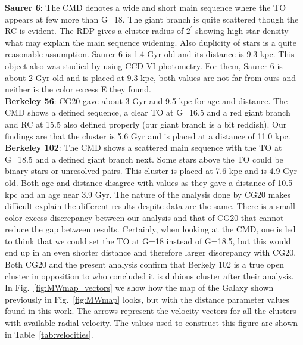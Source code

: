 \documentclass[draft]{aa}
\begin{document}
  \textbf{Saurer 6}: The CMD denotes a wide and short main sequence where the TO
  appears at few more than G=18. The giant branch is quite scattered though the
  RC is evident. The RDP gives a cluster radius of $2^{\prime}$ showing high
  star density what may explain the main sequence widening. Also duplicity of
  stars is a quite reasonable assumption. Saurer 6 is 1.4 Gyr old and its
  distance is 9.3 kpc. This object also was studied by
  \cite{Frinchaboy_2002} using CCD VI photometry. For them, Saurer 6 is about 2
  Gyr old and is placed at 9.3 kpc, both values are not far from ours and
  neither is the color excess E they found.\\

  \textbf{Berkeley 56}: CG20 gave about 3 Gyr and 9.5 kpc for age and distance. The CMD
  shows a defined sequence, a clear TO at G=16.5 and a red giant branch and RC
  at 15.5 also defined properly (our giant branch is a bit reddish).  Our
  findings are that the cluster is 5.6 Gyr and is placed at a distance of 11.0
  kpc.\\

  \textbf{Berkeley 102}: The CMD shows a scattered main sequence with the
  TO at G=18.5 and a defined giant branch next. Some stars above the TO could be
  binary stars or unresolved pairs. This cluster is placed at 7.6 kpc and is 4.9
  Gyr old. Both age and distance disagree with \cite{Cantat_2020}
  values as they gave a distance of 10.5 kpc and an age near
  3.9 Gyr. The nature of the analysis done by CG20 makes difficult
  explain the different results despite data are the same. There is a small
  color excess discrepancy between our analysis and that of CG20 that cannot
  reduce the gap between results. Certainly, when looking at the CMD, one is led
  to think that we could set the TO at G=18 instead of G=18.5, but this would
  end up in an even shorter distance and therefore larger discrepancy with CG20.
  Both CG20 and the present analysis confirm that Berkely 102 is a true open cluster
  in opposition to \cite{Maciejewski_2008} who concluded it is dubious cluster after their
  analysis.\\


  In Fig.~\ref{fig:MWmap_vectors} we show how the map of the Galaxy shown
  previously in Fig.~\ref{fig:MWmap} looks, but with the distance parameter
  values found in this work. The arrows represent the velocity vectors for all
  the clusters with available radial velocity. The values used to construct this
  figure are shown in Table~\ref{tab:velocities}.
 
\end{document}
